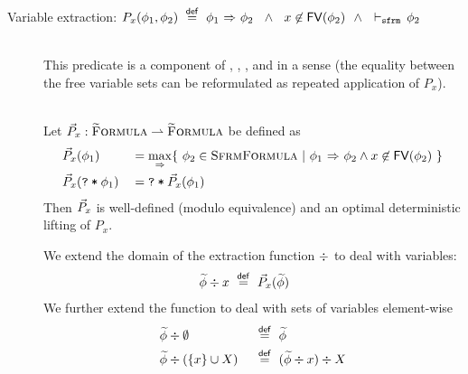 \begin{description}
    \item[Variable extraction: $P_x(\phi_1, \phi_2) ~\overset{\textup{\textmd{\textsf{def}}}}{=}~ {\phi_1} \,\,{\Rightarrow}\,\, {\phi_2} ~~\wedge~~ x \not \in \textup{\textmd{\textsf{FV}}}(\phi_2) ~~\wedge~~ \vdash_\texttt{sfrm}\, \phi_2$]~\\
    This predicate is a component of , , ,  and in a sense  (the equality between the free variable sets can be reformulated as repeated application of $P_x$).
    \begin{lemma}~\\
        Let $\vec{P}_x : \textup{\textsc{\ensuremath{\widetilde{\text{F}}}ormula}} \rightharpoonup \textup{\textsc{\ensuremath{\widetilde{\text{F}}}ormula}}$ be defined as
        \begin{alignat*}{2}
        & \vec{P}_x(\phi_1)          & &= \underset{{} \,\,{\Rightarrow}\,\, {}}{\max} \{~ \phi_2 \in \textup{\textsc{SfrmFormula}} ~|~ {\phi_1} \,\,{\Rightarrow}\,\, {\phi_2} \wedge x \not \in \textup{\textmd{\textsf{FV}}}(\phi_2) ~\} \\
        & \vec{P}_x(\textup{\texttt{\textup{\texttt{?}}\:*\:\ensuremath{\phi_1}}}) & &= \textup{\texttt{\textup{\texttt{?}}\:*\:\ensuremath{\vec{P}_x(\phi_1)}}}
        \end{alignat*}
        Then $\vec{P}_x$ is well-defined (modulo equivalence) and an optimal deterministic lifting of $P_x$.
    \end{lemma}
    We extend the domain of the extraction function $\div$ to deal with variables:
    \begin{alignat*}{2}
        & \widetilde{\phi}\div x ~\overset{\textup{\textmd{\textsf{def}}}}{=}~ \vec{P}_x(\widetilde{\phi}) & ~
    \end{alignat*}
    We further extend the function to deal with sets of variables element-wise
    \begin{alignat*}{2}
    	 & \widetilde{\phi}\div\emptyset        & & ~\overset{\textup{\textmd{\textsf{def}}}}{=}~ \widetilde{\phi}                   \\
    	 & \widetilde{\phi}\div(\{ x \} \cup X) & & ~\overset{\textup{\textmd{\textsf{def}}}}{=}~ (\widetilde{\phi}\div x)\div X
    \end{alignat*}
\end{description}
